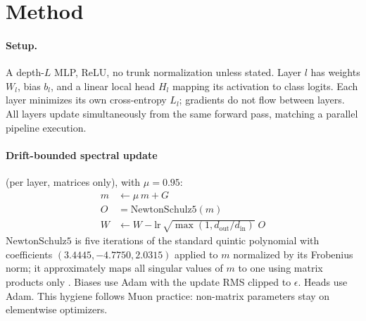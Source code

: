 \documentclass[11pt]{article}
\newcommand{\eps}{\epsilon}
\begin{document}
\section{Method}

\paragraph{Setup.} A depth-$L$ MLP, ReLU, no trunk normalization unless stated. Layer $l$ has weights $W_l$, bias $b_l$, and a linear local head $H_l$ mapping its activation to class logits. Each layer minimizes its own cross-entropy $L_l$; gradients do not flow between layers. All layers update simultaneously from the same forward pass, matching a parallel pipeline execution.

\paragraph{Drift-bounded spectral update} (per layer, matrices only), with $\mu = 0.95$:
\begin{align}
m &\leftarrow \mu\, m + G \\
O &= \mathrm{NewtonSchulz5}(m) \\
W &\leftarrow W - \mathrm{lr}\, \sqrt{\max(1, d_{\text{out}}/d_{\text{in}})}\; O
\end{align}
$\mathrm{NewtonSchulz5}$ is five iterations of the standard quintic polynomial with coefficients $(3.4445, -4.7750, 2.0315)$ applied to $m$ normalized by its Frobenius norm; it approximately maps all singular values of $m$ to one using matrix products only \citep{jordan2024muon}. Biases use Adam with the update RMS clipped to $\eps$. Heads use Adam. This hygiene follows Muon practice: non-matrix parameters stay on elementwise optimizers.
\end{document}
